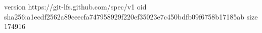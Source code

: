 version https://git-lfs.github.com/spec/v1
oid sha256:a1ecdf2562a89ceecfa747958929f220ef35023e7c450bdfb09f6758b17185ab
size 174916
